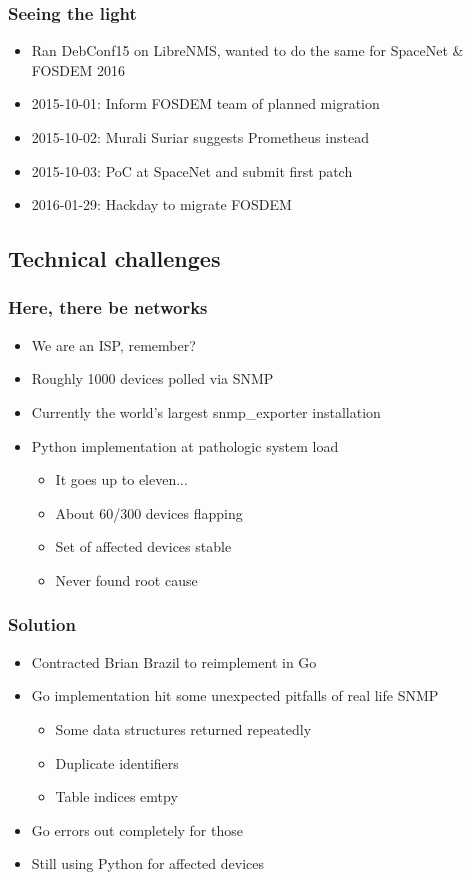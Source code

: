 \documentclass[t]{beamer}
\begin{document}
\begin{frame}
	\frametitle{Seeing the light}
	\begin{itemize}
		\item Ran DebConf15 on LibreNMS, wanted to do the same for SpaceNet \& FOSDEM 2016
		\item 2015-10-01: Inform FOSDEM team of planned migration
		\item 2015-10-02: Murali Suriar suggests Prometheus instead
		\item 2015-10-03: PoC at SpaceNet and submit first patch
		\item 2016-01-29: Hackday to migrate FOSDEM
	\end{itemize}
\end{frame}

\subsection{Technical challenges}

\begin{frame}
	\frametitle{Here, there be networks}
	\begin{itemize}
		\item We are an ISP, remember?
		\item Roughly 1000 devices polled via SNMP
		\item Currently the world's largest snmp\_exporter installation
		\item Python implementation at pathologic system load
		\begin{itemize}
			\item It goes up to eleven...
			\item About 60/300 devices flapping
			\item Set of affected devices stable
			\item Never found root cause
		\end{itemize}
	\end{itemize}
\end{frame}

\begin{frame}
	\frametitle{Solution}
	\begin{itemize}
		\item Contracted Brian Brazil to reimplement in Go
		\item Go implementation hit some unexpected pitfalls of real life SNMP
		\begin{itemize}
			\item Some data structures returned repeatedly
			\item Duplicate identifiers
			\item Table indices emtpy
		\end{itemize}
		\item Go errors out completely for those
		\item Still using Python for affected devices
	\end{itemize}
\end{frame}
\end{document}
